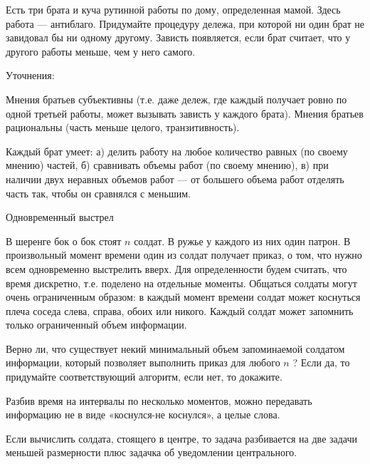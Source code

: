 \begin{problem}

Есть три брата и куча рутинной работы по дому, определенная мамой. Здесь работа — антиблаго. Придумайте процедуру дележа, при которой ни один брат не завидовал бы ни одному другому. Зависть появляется, если брат считает, что у другого работы меньше, чем у него самого. \par
Уточнения: \par
Мнения братьев субъективны (т.е. даже дележ, где каждый получает ровно по одной третьей работы, может вызывать зависть у каждого брата). Мнения братьев рациональны (часть меньше целого, транзитивность). \par
Каждый брат умеет: а) делить работу на любое количество равных (по своему мнению) частей, б) сравнивать объемы работ (по своему мнению), в) при наличии двух неравных объемов работ — от большего объема работ отделять часть так, чтобы он сравнялся с меньшим\cite{peterson:epefcd}.



\begin{sol}

\end{sol}
\end{problem}



\begin{problem}
 Одновременный выстрел\par
В шеренге бок о бок стоят  $n$  солдат. В ружье у каждого из них один патрон. В произвольный момент времени один из солдат получает приказ, о том, что нужно всем одновременно выстрелить вверх. Для определенности будем считать, что время дискретно, т.е. поделено на отдельные моменты. Общаться солдаты могут очень ограниченным образом: в каждый момент времени солдат может коснуться плеча соседа слева, справа, обоих или никого. Каждый солдат может запомнить только ограниченный объем информации.\par
Верно ли, что существует некий минимальный объем запоминаемой солдатом информации, который позволяет выполнить приказ для любого  $n$ ? Если да, то придумайте соответствующий алгоритм, если нет, то докажите.



\begin{sol}

Разбив время на интервалы по несколько моментов, можно передавать информацию не в виде «коснулся-не коснулся», а целые слова.\par
Если вычислить солдата, стоящего в центре, то задача разбивается на две задачи меньшей размерности плюс задачка об уведомлении центрального.
\end{sol}
\end{problem}


